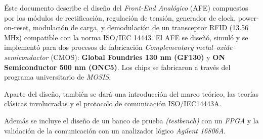 Éste documento describe el diseño del \textit{Front-End Analógico} (AFE) compuestos por los módulos de rectificación, regulación de tensión, generador de clock, power-on-reset, modulación de carga, y demodulación de un transceptor RFID (13.56 MHz) compatible con la norma ISO/IEC 14443. El AFE se diseñó, simuló y se implementó para dos procesos de fabricación \textit{Complementary metal–oxide–semiconductor} (CMOS): \textbf{Global Foundries 130 nm (GF130)} y \textbf{ON Semiconductor 500 nm (ONC5)}. Los chips se fabricaron a través del programa universitario de \textit{MOSIS}.

Aparte del diseño, también se dará una introducción del marco teórico, las teorías clásicas involucradas y el protocolo de comunicación ISO/IEC14443A.

Además se incluye el diseño de un banco de prueba \textit{(testbench)} con un \textit{FPGA} y la validación de la comunicación con un analizador lógico \textit{Agilent 16806A}.
